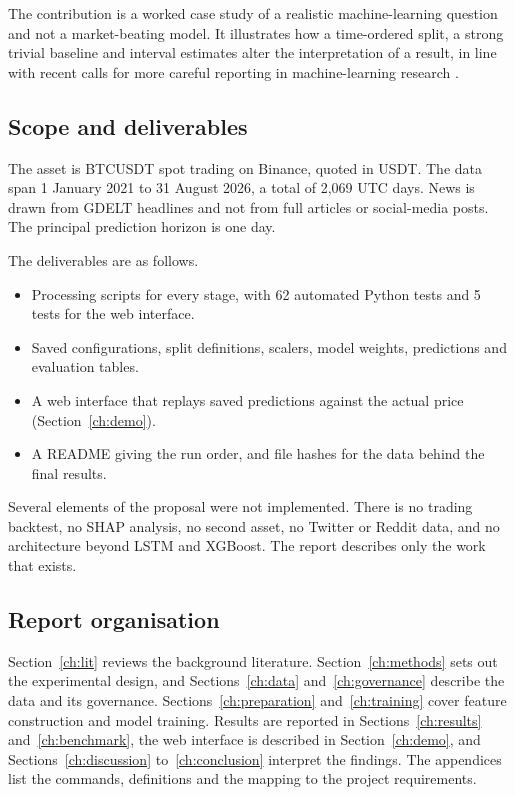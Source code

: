 The contribution is a worked case study of a realistic machine-learning question and not a market-beating model. It illustrates how a time-ordered split, a strong trivial baseline and interval estimates alter the interpretation of a result, in line with recent calls for more careful reporting in machine-learning research \cite{pineau2021,bouthillier2021}.

\subsection{Scope and deliverables}
The asset is BTCUSDT spot trading on Binance, quoted in USDT. The data span 1 January 2021 to 31 August 2026, a total of 2,069 UTC days. News is drawn from GDELT headlines and not from full articles or social-media posts. The principal prediction horizon is one day.

The deliverables are as follows.
\begin{itemize}
\item Processing scripts for every stage, with 62 automated Python tests and 5 tests for the web interface.
\item Saved configurations, split definitions, scalers, model weights, predictions and evaluation tables.
\item A web interface that replays saved predictions against the actual price (Section~\ref{ch:demo}).
\item A README giving the run order, and file hashes for the data behind the final results.
\end{itemize}
Several elements of the proposal were not implemented. There is no trading backtest, no SHAP analysis, no second asset, no Twitter or Reddit data, and no architecture beyond LSTM and XGBoost. The report describes only the work that exists.

\subsection{Report organisation}
Section~\ref{ch:lit} reviews the background literature. Section~\ref{ch:methods} sets out the experimental design, and Sections~\ref{ch:data} and~\ref{ch:governance} describe the data and its governance. Sections~\ref{ch:preparation} and~\ref{ch:training} cover feature construction and model training. Results are reported in Sections~\ref{ch:results} and~\ref{ch:benchmark}, the web interface is described in Section~\ref{ch:demo}, and Sections~\ref{ch:discussion} to~\ref{ch:conclusion} interpret the findings. The appendices list the commands, definitions and the mapping to the project requirements.
